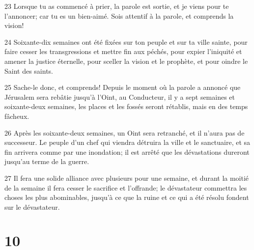 \par 23 Lorsque tu as commencé à prier, la parole est sortie, et je viens pour te l'annoncer; car tu es un bien-aimé. Sois attentif à la parole, et comprends la vision!
\par 24 Soixante-dix semaines ont été fixées sur ton peuple et sur ta ville sainte, pour faire cesser les transgressions et mettre fin aux péchés, pour expier l'iniquité et amener la justice éternelle, pour sceller la vision et le prophète, et pour oindre le Saint des saints.
\par 25 Sache-le donc, et comprends! Depuis le moment où la parole a annoncé que Jérusalem sera rebâtie jusqu'à l'Oint, au Conducteur, il y a sept semaines et soixante-deux semaines, les places et les fossés seront rétablis, mais en des temps fâcheux.
\par 26 Après les soixante-deux semaines, un Oint sera retranché, et il n'aura pas de successeur. Le peuple d'un chef qui viendra détruira la ville et le sanctuaire, et sa fin arrivera comme par une inondation; il est arrêté que les dévastations dureront jusqu'au terme de la guerre.
\par 27 Il fera une solide alliance avec plusieurs pour une semaine, et durant la moitié de la semaine il fera cesser le sacrifice et l'offrande; le dévastateur commettra les choses les plus abominables, jusqu'à ce que la ruine et ce qui a été résolu fondent sur le dévastateur.

\chapter{10}

